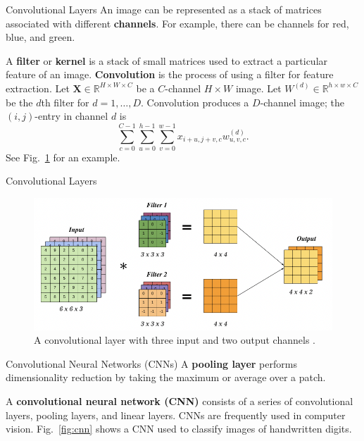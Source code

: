 \documentclass{beamer}
\begin{document}
\begin{frame}{Convolutional Layers}
    An image can be represented as a stack of matrices associated with different \textbf{channels}. For example, there can be channels for red, blue, and green.
    
    \medskip
    
    A \textbf{filter} or \textbf{kernel} is a stack of small matrices used to extract a particular feature of an image. \textbf{Convolution} is the process of using a filter for feature extraction. Let $\boldsymbol{X} \in \mathbb{R}^{H \times W \times C}$ be a $C$-channel $H \times W$ image. Let $W^{(d)} \in \mathbb{R}^{h \times w \times C}$ be the $d$th filter for $d = 1, \ldots, D$. Convolution produces a $D$-channel image; the $(i, j)$-entry in channel $d$ is
    \[
    \sum_{c = 0}^{C - 1} \sum_{u = 0}^{h - 1} \sum_{v = 0}^{w - 1} x_{i + u, j + v, c}w_{u, v, c}^{(d)}.
    \]
    See Fig.~\ref{fig:convolutional_layer} for an example.
\end{frame}

\begin{frame}{Convolutional Layers}
    \begin{figure}
        \centering
        \includegraphics[scale=0.8]{convolutional_layer}
        \caption{A convolutional layer with three input and two output channels \cite{pml2Book}.}
        \label{fig:convolutional_layer}
    \end{figure}
\end{frame}

\begin{frame}{Convolutional Neural Networks (CNNs)}
    A \textbf{pooling layer} performs dimensionality reduction by taking the maximum or average over a patch.

    \medskip

    A \textbf{convolutional neural network (CNN)} consists of a series of convolutional layers, pooling layers, and linear layers. CNNs are frequently used in computer vision. Fig.~\ref{fig:cnn} shows a CNN used to classify images of handwritten digits.
\end{frame}
\end{document}
